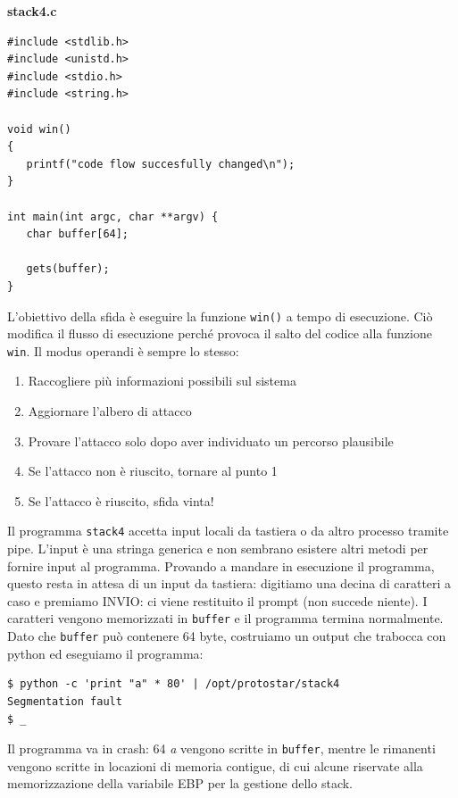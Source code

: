 \begin{mdframed}[backgroundcolor=white!20,shadow=false]
\textbf{stack4.c}
\begin{verbatim}
#include <stdlib.h>
#include <unistd.h>
#include <stdio.h>
#include <string.h>

void win()
{
   printf("code flow succesfully changed\n");
}

int main(int argc, char **argv) {
   char buffer[64];

   gets(buffer);
} 
\end{verbatim}
\end{mdframed}
L'obiettivo della sfida è eseguire la funzione \texttt{win()} a tempo di esecuzione. Ciò modifica il flusso di esecuzione perché provoca il salto del codice alla funzione \texttt{win}. Il modus operandi è sempre lo stesso:
\begin{enumerate}
    \item Raccogliere più informazioni possibili sul sistema
    \item Aggiornare l'albero di attacco
    \item Provare l'attacco solo dopo aver individuato un
percorso plausibile
    \item Se l'attacco non è riuscito, tornare al punto 1
    \item Se l'attacco è riuscito, sfida vinta! 
\end{enumerate} 
Il programma \texttt{stack4} accetta input locali da tastiera o da altro processo tramite pipe. L'input è una stringa generica e non sembrano esistere altri metodi per fornire input al programma. Provando a mandare in esecuzione il programma, questo resta in attesa di un input da tastiera: digitiamo una decina di caratteri a caso e premiamo INVIO: ci viene restituito il prompt (non succede niente). I caratteri vengono memorizzati in \texttt{buffer} e il programma termina normalmente. Dato che \texttt{buffer} può contenere 64 byte, costruiamo un output che trabocca con python ed eseguiamo il programma:
\begin{mdframed}[backgroundcolor=white!20,shadow=false]
\begin{lstlisting}
$ python -c 'print "a" * 80' | /opt/protostar/stack4
Segmentation fault
$ _
\end{lstlisting}
\end{mdframed}
Il programma va in crash: 64 \textit{a} vengono scritte in \texttt{buffer}, mentre le rimanenti vengono scritte in locazioni di memoria contigue, di cui alcune riservate alla memorizzazione della variabile EBP per la gestione dello stack. 

